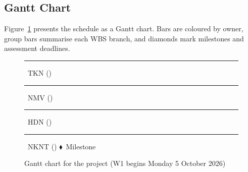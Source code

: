 

\subsection{Gantt Chart}\label{sec:gantt}

Figure~\ref{fig:gantt} presents the schedule as a Gantt chart. Bars are coloured by owner, group bars summarise each WBS branch, and diamonds mark milestones and assessment deadlines.

\begin{figure}[p]
\centering
\resizebox{\textwidth}{!}{}

\smallskip
{\scriptsize\sffamily
\textcolor{ownerTKN}{\rule{9pt}{6pt}}~TKN (\memberOne) \quad
\textcolor{ownerNMV}{\rule{9pt}{6pt}}~NMV (\memberTwo) \quad
\textcolor{ownerHDN}{\rule{9pt}{6pt}}~HDN (\memberThree) \quad
\textcolor{ownerNKNT}{\rule{9pt}{6pt}}~NKNT (\memberFour) \quad
\textcolor{brandaccent}{$\blacklozenge$}~Milestone}
\caption{Gantt chart for the \projectname{} project (W1 begins Monday 5 October 2026)}
\label{fig:gantt}
\end{figure}
